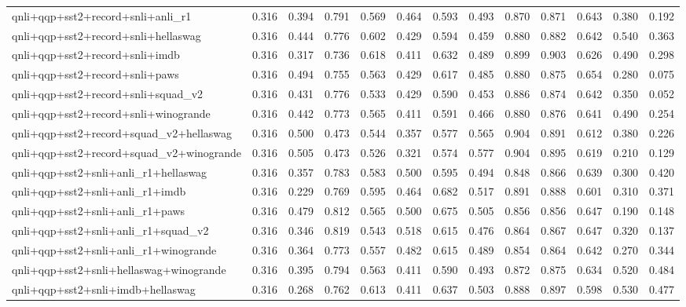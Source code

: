 \begin{table}[t]
\begin{tabular}{lrrrrrrrrrrrr}
    qnli+qqp+sst2+record+snli+anli\_r1 & 0.316 & 0.394 & 0.791 & 0.569 & 0.464 & 0.593 & 0.493 & 0.870 & 0.871 & 0.643 & 0.380 & 0.192 \\
    qnli+qqp+sst2+record+snli+hellaswag & 0.316 & 0.444 & 0.776 & 0.602 & 0.429 & 0.594 & 0.459 & 0.880 & 0.882 & 0.642 & 0.540 & 0.363 \\
    qnli+qqp+sst2+record+snli+imdb & 0.316 & 0.317 & 0.736 & 0.618 & 0.411 & 0.632 & 0.489 & 0.899 & 0.903 & 0.626 & 0.490 & 0.298 \\
    qnli+qqp+sst2+record+snli+paws & 0.316 & 0.494 & 0.755 & 0.563 & 0.429 & 0.617 & 0.485 & 0.880 & 0.875 & 0.654 & 0.280 & 0.075 \\
    qnli+qqp+sst2+record+snli+squad\_v2 & 0.316 & 0.431 & 0.776 & 0.533 & 0.429 & 0.590 & 0.453 & 0.886 & 0.874 & 0.642 & 0.350 & 0.052 \\
    qnli+qqp+sst2+record+snli+winogrande & 0.316 & 0.442 & 0.773 & 0.565 & 0.411 & 0.591 & 0.466 & 0.880 & 0.876 & 0.641 & 0.490 & 0.254 \\
    qnli+qqp+sst2+record+squad\_v2+hellaswag & 0.316 & 0.500 & 0.473 & 0.544 & 0.357 & 0.577 & 0.565 & 0.904 & 0.891 & 0.612 & 0.380 & 0.226 \\
    qnli+qqp+sst2+record+squad\_v2+winogrande & 0.316 & 0.505 & 0.473 & 0.526 & 0.321 & 0.574 & 0.577 & 0.904 & 0.895 & 0.619 & 0.210 & 0.129 \\
    qnli+qqp+sst2+snli+anli\_r1+hellaswag & 0.316 & 0.357 & 0.783 & 0.583 & 0.500 & 0.595 & 0.494 & 0.848 & 0.866 & 0.639 & 0.300 & 0.420 \\
    qnli+qqp+sst2+snli+anli\_r1+imdb & 0.316 & 0.229 & 0.769 & 0.595 & 0.464 & 0.682 & 0.517 & 0.891 & 0.888 & 0.601 & 0.310 & 0.371 \\
    qnli+qqp+sst2+snli+anli\_r1+paws & 0.316 & 0.479 & 0.812 & 0.565 & 0.500 & 0.675 & 0.505 & 0.856 & 0.856 & 0.647 & 0.190 & 0.148 \\
    qnli+qqp+sst2+snli+anli\_r1+squad\_v2 & 0.316 & 0.346 & 0.819 & 0.543 & 0.518 & 0.615 & 0.476 & 0.864 & 0.867 & 0.647 & 0.320 & 0.137 \\
    qnli+qqp+sst2+snli+anli\_r1+winogrande & 0.316 & 0.364 & 0.773 & 0.557 & 0.482 & 0.615 & 0.489 & 0.854 & 0.864 & 0.642 & 0.270 & 0.344 \\
    qnli+qqp+sst2+snli+hellaswag+winogrande & 0.316 & 0.395 & 0.794 & 0.563 & 0.411 & 0.590 & 0.493 & 0.872 & 0.875 & 0.634 & 0.520 & 0.484 \\
    qnli+qqp+sst2+snli+imdb+hellaswag & 0.316 & 0.268 & 0.762 & 0.613 & 0.411 & 0.637 & 0.503 & 0.888 & 0.897 & 0.598 & 0.530 & 0.477 \\

\end{tabular}
\end{table}
